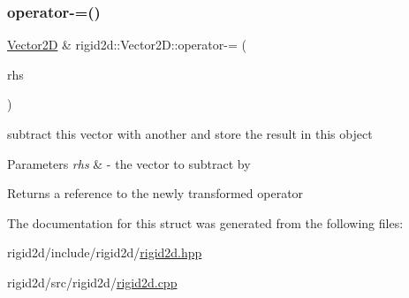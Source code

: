 \subsubsection{\texorpdfstring{operator-\/=()}{operator-=()}}
{\footnotesize\ttfamily \hyperlink{structrigid2d_1_1Vector2D}{Vector2D} \& rigid2d\+::\+Vector2\+D\+::operator-\/= (\begin{DoxyParamCaption}\item[{const \hyperlink{structrigid2d_1_1Vector2D}{Vector2D} \&}]{rhs }\end{DoxyParamCaption})}



subtract this vector with another and store the result in this object 


\begin{DoxyParams}{Parameters}
{\em rhs} & -\/ the vector to subtract by \\
\hline
\end{DoxyParams}
\begin{DoxyReturn}{Returns}
a reference to the newly transformed operator 
\end{DoxyReturn}


The documentation for this struct was generated from the following files\+:\begin{DoxyCompactItemize}
\item 
rigid2d/include/rigid2d/\hyperlink{rigid2d_8hpp}{rigid2d.\+hpp}\item 
rigid2d/src/rigid2d/\hyperlink{rigid2d_8cpp}{rigid2d.\+cpp}\end{DoxyCompactItemize}
